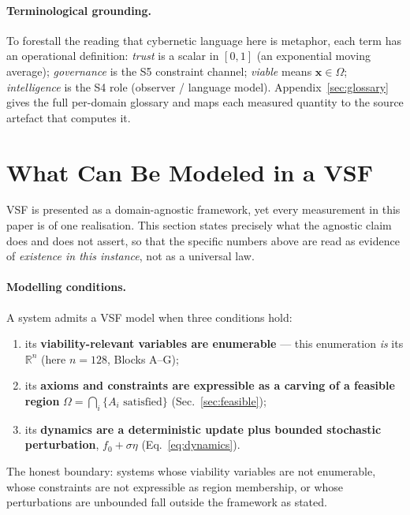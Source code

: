 \documentclass[11pt, a4paper]{article}
\newcommand{\R}{\mathbb{R}}
\newcommand{\sv}{\bm{x}}
\begin{document}
\paragraph{Terminological grounding.} To forestall the reading that cybernetic
language here is metaphor, each term has an operational definition: \emph{trust}
is a scalar in $[0,1]$ (an exponential moving average); \emph{governance} is the
S5 constraint channel; \emph{viable} means $\sv \in \Omega$; \emph{intelligence}
is the S4 role (observer / language model). Appendix~\ref{sec:glossary} gives the
full per-domain glossary and maps each measured quantity to the source artefact
that computes it.


\section{What Can Be Modeled in a VSF}
\label{sec:what_vsf_models}

VSF is presented as a domain-agnostic framework, yet every measurement in this
paper is of one realisation. This section states precisely what the agnostic
claim does and does not assert, so that the specific numbers above are read as
evidence of \emph{existence in this instance}, not as a universal law.

\paragraph{Modelling conditions.} A system admits a VSF model when three
conditions hold:
\begin{enumerate}
  \item its \textbf{viability-relevant variables are enumerable} --- this
        enumeration \emph{is} its $\R^n$ (here $n = 128$, Blocks A--G);
  \item its \textbf{axioms and constraints are expressible as a carving of a
        feasible region} $\Omega = \bigcap_i \{A_i \text{ satisfied}\}$ (Sec.~\ref{sec:feasible});
  \item its \textbf{dynamics are a deterministic update plus bounded stochastic
        perturbation}, $f_0 + \sigma\eta$ (Eq.~\eqref{eq:dynamics}).
\end{enumerate}
The honest boundary: systems whose viability variables are not enumerable, whose
constraints are not expressible as region membership, or whose perturbations are
unbounded fall outside the framework as stated.
\end{document}
